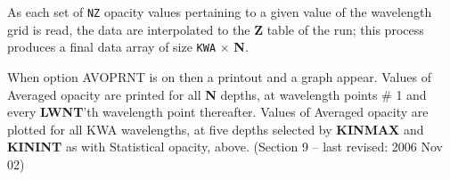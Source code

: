 As each set of {\tt NZ} opacity values pertaining to a given value of the
wavelength grid is read, the data are interpolated to the {\bf Z} table
of the run; this process produces a final data array of size {\tt KWA}
$ \times $ {\bf N}.

When option AVOPRNT is on then a printout and a graph appear. Values of
Averaged opacity are printed for all {\bf N} depths, at wavelength
points \# 1 and every {\bf LWNT}'th wavelength point thereafter. Values
of Averaged opacity are plotted for all KWA wavelengths, at five
depths selected by {\bf KINMAX} and {\bf KININT} as with Statistical
opacity, above.
\vfill
\noindent (Section 9 -- last revised: 2006 Nov 02) \par
{}
\ej
